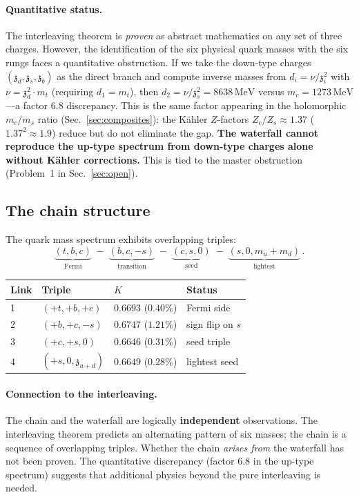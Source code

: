 \documentclass[aps,prd,twocolumn,showpacs,preprintnumbers,superscriptaddress,floatfix]{revtex4-2}
\newcommand{\MeV}{\,\mathrm{MeV}}
\newcommand{\zch}{\mathfrak{z}}
\begin{document}
\paragraph{Quantitative status.}
The interleaving theorem is \emph{proven} as abstract mathematics
on any set of three charges.
However, the identification of the six physical quark masses with
the six rungs faces a quantitative obstruction.
If we take the down-type charges $(\zch_d, \zch_s, \zch_b)$ as
the direct branch and compute inverse masses from
$d_i = \nu/\zch_i^2$ with $\nu = \zch_d^2 \cdot m_t$ (requiring
$d_1 = m_t$), then $d_2 = \nu/\zch_s^2 = 8638\MeV$ versus
$m_c = 1273\MeV$---a factor $6.8$ discrepancy.
This is the same factor appearing in the holomorphic $m_c/m_s$
ratio (Sec.~\ref{sec:composites}): the K\"ahler $Z$-factors
$Z_c/Z_s \approx 1.37$ ($1.37^2 \approx 1.9$) reduce but do
not eliminate the gap.
\textbf{The waterfall cannot reproduce the up-type spectrum from
down-type charges alone without K\"ahler corrections.}
This is tied to the master obstruction
(Problem~1 in Sec.~\ref{sec:open}).


\subsection{The chain structure}

The quark mass spectrum exhibits overlapping triples:
\begin{equation}
  \underbrace{(t,b,c)}_{\text{Fermi}} \;-\;
  \underbrace{(b,c,-s)}_{\text{transition}} \;-\;
  \underbrace{(c,s,0)}_{\text{seed}} \;-\;
  \underbrace{(s,0,m_u{+}m_d)}_{\text{lightest}}\,.
  \label{eq:chain}
\end{equation}

\begin{center}
\begin{tabular}{llll}
\hline
Link & Triple & $K$ & Status \\
\hline
1 & $(+t, +b, +c)$ & $0.6693$ ($0.40\%$) & Fermi side \\
2 & $(+b, +c, -s)$ & $0.6747$ ($1.21\%$) & sign flip on $s$ \\
3 & $(+c, +s, 0)$ & $0.6646$ ($0.31\%$) & seed triple \\
4 & $(+s, 0, \zch_{u+d})$ & $0.6649$ ($0.28\%$) & lightest seed \\
\hline
\end{tabular}
\end{center}

\paragraph{Connection to the interleaving.}
The chain and the waterfall are logically \textbf{independent}
observations.
The interleaving theorem predicts an alternating pattern of six
masses; the chain is a sequence of overlapping triples.
Whether the chain \emph{arises from} the waterfall has not been
proven.
The quantitative discrepancy (factor $6.8$ in the up-type
spectrum) suggests that additional physics beyond the pure
interleaving is needed.
\end{document}
